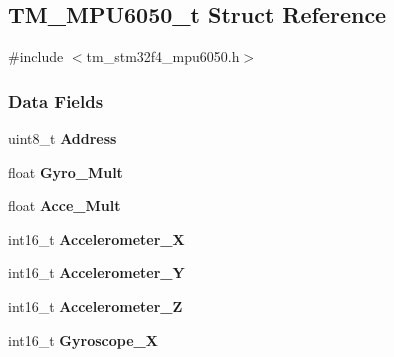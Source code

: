 \hypertarget{struct_t_m___m_p_u6050__t}{}\subsection{T\+M\+\_\+\+M\+P\+U6050\+\_\+t Struct Reference}
\label{struct_t_m___m_p_u6050__t}


{\ttfamily \#include $<$tm\+\_\+stm32f4\+\_\+mpu6050.\+h$>$}

\subsubsection*{Data Fields}
\begin{DoxyCompactItemize}
\item 
\hypertarget{struct_t_m___m_p_u6050__t_ae2bbeaf207df18992544fd4193b34112}{}uint8\+\_\+t {\bfseries Address}\label{struct_t_m___m_p_u6050__t_ae2bbeaf207df18992544fd4193b34112}

\item 
\hypertarget{struct_t_m___m_p_u6050__t_a16ae00b291a84a3021843b4ebe00171d}{}float {\bfseries Gyro\+\_\+\+Mult}\label{struct_t_m___m_p_u6050__t_a16ae00b291a84a3021843b4ebe00171d}

\item 
\hypertarget{struct_t_m___m_p_u6050__t_ae0c61b9c9be32e545f2b4c9353b2cc4f}{}float {\bfseries Acce\+\_\+\+Mult}\label{struct_t_m___m_p_u6050__t_ae0c61b9c9be32e545f2b4c9353b2cc4f}

\item 
\hypertarget{struct_t_m___m_p_u6050__t_a9360851669525959e6032908171c489a}{}int16\+\_\+t {\bfseries Accelerometer\+\_\+\+X}\label{struct_t_m___m_p_u6050__t_a9360851669525959e6032908171c489a}

\item 
\hypertarget{struct_t_m___m_p_u6050__t_a7189c66d4092f4847bab74c578b315a8}{}int16\+\_\+t {\bfseries Accelerometer\+\_\+\+Y}\label{struct_t_m___m_p_u6050__t_a7189c66d4092f4847bab74c578b315a8}

\item 
\hypertarget{struct_t_m___m_p_u6050__t_a0548aadcd1bbeeee85a4b931c8295014}{}int16\+\_\+t {\bfseries Accelerometer\+\_\+\+Z}\label{struct_t_m___m_p_u6050__t_a0548aadcd1bbeeee85a4b931c8295014}

\item 
\hypertarget{struct_t_m___m_p_u6050__t_a3bf665a66e802c2b74fbcd3755e58b3d}{}int16\+\_\+t {\bfseries Gyroscope\+\_\+\+X}\label{struct_t_m___m_p_u6050__t_a3bf665a66e802c2b74fbcd3755e58b3d}


\end{DoxyCompactItemize}
